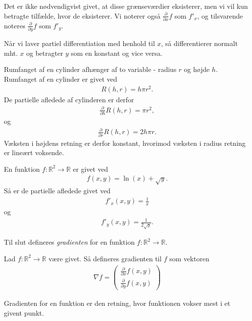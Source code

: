 Det er ikke nødvendigvist givet, at disse grænseværdier eksisterer, men vi vil kun betragte tilfælde, hvor de eksisterer. Vi noterer også $\frac{\partial}{\partial x}f$ som $f'_x$, og tilsvarende noteres $\frac{\partial}{\partial y}f $ som $f'_y$.

Når vi laver partiel differentiation med henhold til $x$, så differentierer normalt mht. $x$ og betragter $y$ som en konstant og vice versa. 

\begin{exa}
	Rumfanget af en cylinder afhænger af to variable - radius $r$ og højde $h$. Rumfanget af en cylinder er givet ved
	\begin{align*}
		R(h,r) = h \pi r^2.
	\end{align*}
	De partielle afledede af cylinderen er derfor
	\begin{align*}
		\frac{\partial}{\partial h}R(h,r) = \pi r^2,
	\end{align*}
	og 
	\begin{align*}
		\frac{\partial}{\partial r}R(h,r) = 2h\pi r.
	\end{align*}
	Væksten i højdens retning er derfor konstant, hvorimod væksten i radius retning er lineært voksende. 
\end{exa}

\begin{exa}
	En funktion $f:\mathbb{R}^2 \to \mathbb{R}$ er givet ved
	\begin{align*}
		f(x,y) = \ln(x) + \sqrt{y}.
	\end{align*}	 
	Så er de partielle afledede givet ved
	\begin{align*}
		f'_x(x,y) = \frac{1}{x}
	\end{align*}
	og
	\begin{align*}
		f'_y(x,y) = \frac{1}{2\sqrt{y}}.
	\end{align*}
\end{exa}

Til slut defineres \textit{gradienten} for en funktion $f:\mathbb{R}^2 \to \mathbb{R}$.
\begin{defn}[Gradient]
	Lad $f:\mathbb{R}^2 \to \mathbb{R}$ være givet. Så defineres gradienten til $f$ som vektoren
	\begin{align*}
		\nabla f = 
		\begin{pmatrix}
			\frac{\partial}{\partial x} f(x,y) \\
			\frac{\partial}{\partial y} f(x,y)
		\end{pmatrix}
	\end{align*}
\end{defn}
Gradienten for en funktion er den retning, hvor funktionen vokser mest i et givent punkt. 

